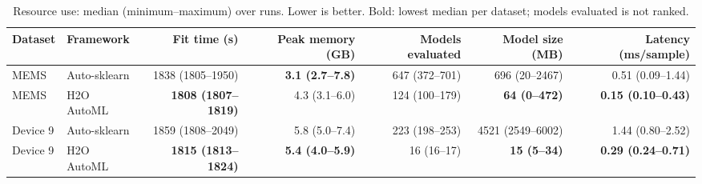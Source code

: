 \begin{table}[t]
\centering
\caption{Resource use: median (minimum--maximum) over runs. Lower is better. Bold: lowest median per dataset; models evaluated is not ranked.}
\label{tab:resources}
\scriptsize
\setlength{\tabcolsep}{3pt}
\begin{tabular}{@{}llrrrrr@{}}
\toprule
Dataset & Framework & Fit time (s) & Peak memory (GB) & Models evaluated & Model size (MB) & Latency (ms/sample) \\
\midrule
MEMS & Auto-sklearn & 1838 (1805--1950) & \textbf{3.1 (2.7--7.8)} & 647 (372--701) & 696 (20--2467) & 0.51 (0.09--1.44) \\
MEMS & H2O AutoML & \textbf{1808 (1807--1819)} & 4.3 (3.1--6.0) & 124 (100--179) & \textbf{64 (0--472)} & \textbf{0.15 (0.10--0.43)} \\
\midrule
Device 9 & Auto-sklearn & 1859 (1808--2049) & 5.8 (5.0--7.4) & 223 (198--253) & 4521 (2549--6002) & 1.44 (0.80--2.52) \\
Device 9 & H2O AutoML & \textbf{1815 (1813--1824)} & \textbf{5.4 (4.0--5.9)} & 16 (16--17) & \textbf{15 (5--34)} & \textbf{0.29 (0.24--0.71)} \\
\bottomrule
\end{tabular}
\end{table}
